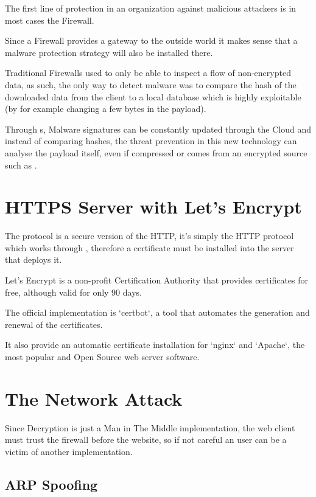 The first line of protection in an organization against malicious attackers is in most cases the Firewall.

Since a Firewall provides a gateway to the outside world it makes sense that a malware protection strategy will also be installed there.

Traditional Firewalls used to only be able to inspect a flow of non-encrypted data, as such, the only way to detect malware was to compare the hash of the downloaded data from the client to a local database which is highly exploitable (by for example changing a few bytes in the payload).

Through s, Malware signatures can be constantly updated through the Cloud and instead of comparing hashes, the threat prevention in this new technology can analyse the payload itself, even if compressed or comes from an encrypted source such as .

\section{HTTPS  Server with Let's Encrypt}

The  protocol is a secure version of the HTTP, it's simply the HTTP protocol which works through ,  therefore a  certificate must be installed into the server that deploys it.

Let's Encrypt is a non-profit Certification Authority that provides  certificates for free, although valid for only 90 days.

The official implementation is `certbot`, a tool that automates the generation and renewal of the certificates.

It also provide an automatic certificate installation for `nginx` and `Apache`, the most popular and Open Source web server software.

\section{The Network Attack}

Since  Decryption is just a Man in The Middle implementation, the web client must trust the firewall before the website, so if not careful an user can be a victim of another  implementation.

\newpage

\subsection{ARP Spoofing}

